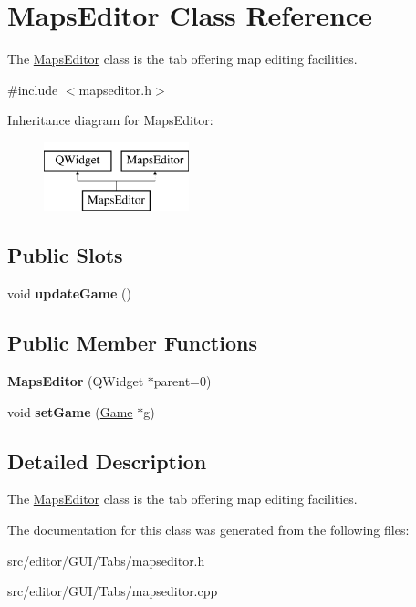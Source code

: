 \hypertarget{class_maps_editor}{}\section{Maps\+Editor Class Reference}
\label{class_maps_editor}


The \hyperlink{class_maps_editor}{Maps\+Editor} class is the tab offering map editing facilities.  




{\ttfamily \#include $<$mapseditor.\+h$>$}

Inheritance diagram for Maps\+Editor\+:\begin{figure}[H]
\begin{center}
\leavevmode
\includegraphics[height=2.000000cm]{class_maps_editor}
\end{center}
\end{figure}
\subsection*{Public Slots}
\begin{DoxyCompactItemize}
\item 
\hypertarget{class_maps_editor_a8bed7de9beb523be5c9568927def310f}{}\label{class_maps_editor_a8bed7de9beb523be5c9568927def310f} 
void {\bfseries update\+Game} ()
\end{DoxyCompactItemize}
\subsection*{Public Member Functions}
\begin{DoxyCompactItemize}
\item 
\hypertarget{class_maps_editor_aff2b57188162ccabbad0583e585bd622}{}\label{class_maps_editor_aff2b57188162ccabbad0583e585bd622} 
{\bfseries Maps\+Editor} (Q\+Widget $\ast$parent=0)
\item 
\hypertarget{class_maps_editor_acdb6e263aff6bea6e0f089da3e6e4a3e}{}\label{class_maps_editor_acdb6e263aff6bea6e0f089da3e6e4a3e} 
void {\bfseries set\+Game} (\hyperlink{class_game}{Game} $\ast$g)
\end{DoxyCompactItemize}


\subsection{Detailed Description}
The \hyperlink{class_maps_editor}{Maps\+Editor} class is the tab offering map editing facilities. 

The documentation for this class was generated from the following files\+:\begin{DoxyCompactItemize}
\item 
src/editor/\+G\+U\+I/\+Tabs/mapseditor.\+h\item 
src/editor/\+G\+U\+I/\+Tabs/mapseditor.\+cpp\end{DoxyCompactItemize}
